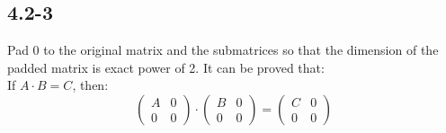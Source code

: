 \subsection{4.2-3}
    Pad 0 to the original matrix and the submatrices so that the dimension of
    the padded matrix is exact power of 2. It can be proved that: \\
    If $A\cdot B = C$, then:
    \begin{displaymath}
    \begin{pmatrix} A & 0 \\ 0 & 0 \end{pmatrix} \cdot
    \begin{pmatrix} B & 0 \\ 0 & 0 \end{pmatrix} =
    \begin{pmatrix} C & 0 \\ 0 & 0 \end{pmatrix}
    \end{displaymath}
